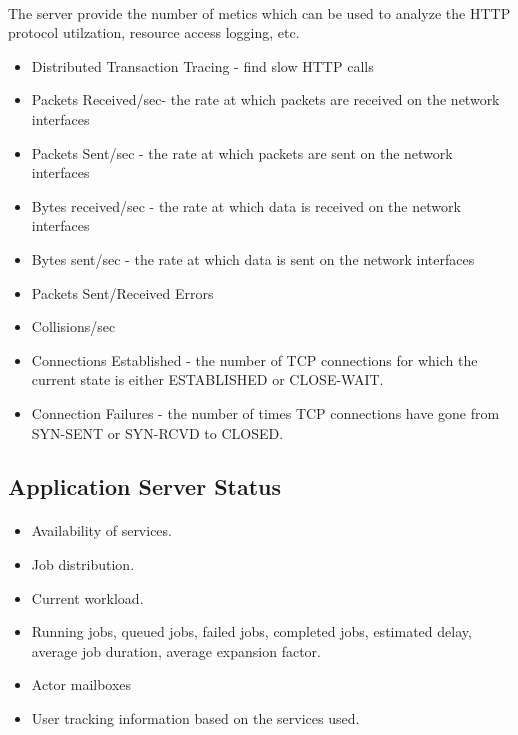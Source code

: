 \paragraph{}
The server provide the number of metics which can be used to analyze the HTTP protocol utilzation, resource access logging, etc.

\begin{itemize}
\item Distributed Transaction Tracing - find slow HTTP calls
\item Packets Received/sec- the rate at which packets are received on the network interfaces
\item Packets Sent/sec - the rate at which packets are sent on the network interfaces
\item Bytes received/sec - the rate at which data is received on the network interfaces
\item Bytes sent/sec  - the rate at which data is sent on the network interfaces
\item Packets Sent/Received Errors
\item Collisions/sec
\item Connections Established - the number of TCP connections for which the current state is either ESTABLISHED or CLOSE-WAIT.
\item Connection Failures - the number of times TCP connections have gone from SYN-SENT or SYN-RCVD to CLOSED.
\end{itemize}

\subsection*{Application Server Status}
\paragraph{}
\begin{itemize}
\item Availability of services.
\item Job distribution.
\item Current workload.
\item Running jobs, queued jobs, failed jobs, completed jobs, estimated delay, average job duration, average expansion factor.
\item Actor mailboxes
\item User tracking information based on the services used.
\end{itemize}

